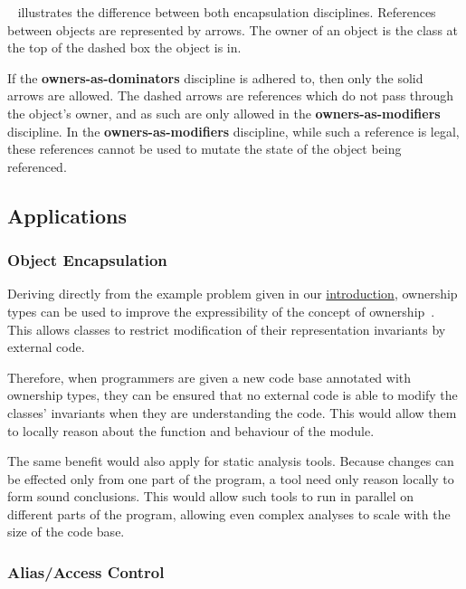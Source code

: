 \documentclass{acm_proc_article-sp}
\begin{document}
~\cite{dietl09gut} illustrates the
difference between both encapsulation disciplines. References between objects
are represented by arrows. The owner of an object is the class at the top of
the dashed box the object is in.

If the \textbf{owners-as-dominators} discipline is adhered to, then only the
solid arrows are allowed. The dashed arrows are references which do not pass
through the object's owner, and as such are only allowed in the
\textbf{owners-as-modifiers} discipline. In the \textbf{owners-as-modifiers}
discipline, while such a reference is legal, these references cannot be used to
mutate the state of the object being referenced.

\subsection{Applications}
\label{subsec:applications}

\subsubsection{Object Encapsulation}
\label{subsubsec:object_encapsulation}

Deriving directly from the example problem given in our
\hyperref[code:modular_reasoning_car_engine_1]{introduction}, ownership types
can be used to improve the expressibility of the concept of
ownership~\cite{clarke98ownership}. This allows classes to restrict
modification of their representation invariants by external code.

Therefore, when programmers are given a new code base annotated with ownership
types, they can be ensured that no external code is able to modify the classes'
invariants when they are understanding the code. This would allow them to
locally reason about the function and behaviour of the module.

The same benefit would also apply for static analysis tools. Because changes can
be effected only from one part of the program, a tool need only reason locally
to form sound conclusions. This would allow such tools to run in parallel on
different parts of the program, allowing even complex analyses to scale with the
size of the code base.

\subsubsection{Alias/Access Control}
\label{subsubsec:alias_control}
\end{document}
